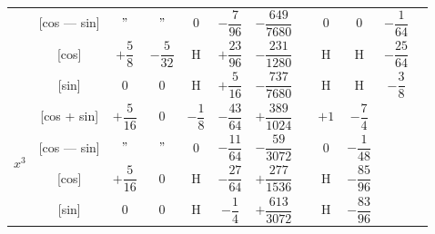\documentclass[11pt,a4paper]{book}
\begin{document}
\begin{center}
\begin{tabular}{|c|c|c|c|c|c|c|c|c|c|c|c|}
& [cos --- sin] & $"$ & $"$ & $0$ & $-\dfrac{7}{96}$ & $-\dfrac{649}{7680}$ & & $0$ & $0$ & $-\dfrac{1}{64}$ \\
& [cos] & $+\dfrac{5}{8}$ & $-\dfrac{5}{32}$ & H & $+\dfrac{23}{96}$ & $-\dfrac{231}{1280}$ & & H & H & $-\dfrac{25}{64}$ \\
& [sin] & $0$ & $0$ & H & $+\dfrac{5}{16}$ & $-\dfrac{737}{7680}$ & & H & H & $-\dfrac{3}{8}$ \\
\hline
\multirow{4}{*}{$x^3$} & [cos + sin] & $+\dfrac{5}{16}$ & $0$ & $-\dfrac{1}{8}$ & $-\dfrac{43}{64}$ & $+\dfrac{389}{1024}$ & & $+1$ & $-\dfrac{7}{4}$ \\
& [cos --- sin] & $"$ & $"$ & $0$ & $-\dfrac{11}{64}$ & $-\dfrac{59}{3072}$ & & $0$ & $-\dfrac{1}{48}$ \\
& [cos] & $+\dfrac{5}{16}$ & $0$ & H & $-\dfrac{27}{64}$ & $+\dfrac{277}{1536}$ & & H & $-\dfrac{85}{96}$ \\
& [sin] & $0$ & $0$ & H & $-\dfrac{1}{4}$ & $+\dfrac{613}{3072}$ & & H & $-\dfrac{83}{96}$ \\
\hline
\end{tabular}
\end{center}

\vspace{1em}

\end{document}
